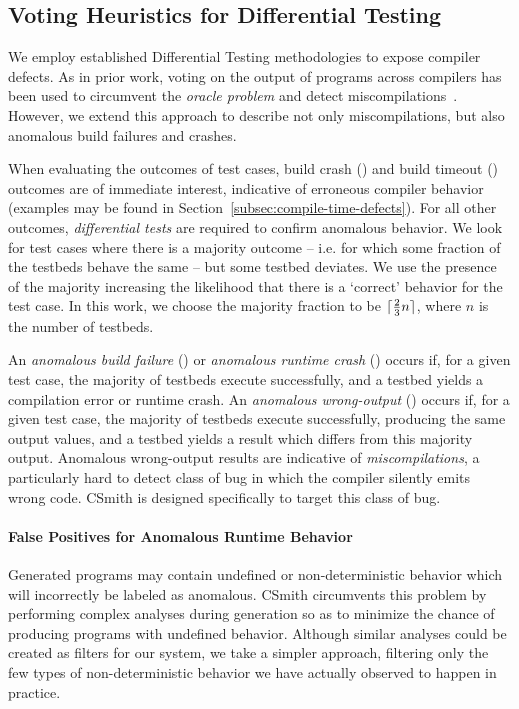 \subsection{Voting Heuristics for Differential Testing}

We employ established Differential Testing methodologies to expose compiler
defects. As in prior work, voting on the output of programs across compilers has
been used to circumvent the \emph{oracle problem} and detect
miscompilations~\cite{McKeeman1998}. However, we extend this approach to
describe not only miscompilations, but also anomalous build failures and
crashes.

When evaluating the outcomes of test cases, build crash (\bc) and build timeout
(\bto) outcomes are of immediate interest, indicative of erroneous compiler
behavior (examples may be found in Section~\ref{subsec:compile-time-defects}).
For all other outcomes, \emph{differential tests} are required to confirm
anomalous behavior. We look for test cases where there is a majority outcome --
i.e. for which some fraction of the testbeds behave the same -- but some testbed
deviates. We use the presence of the majority increasing the likelihood that
there is a `correct' behavior for the test case. In this work, we choose the
majority fraction to be $\lceil\frac{2}{3}n\rceil$, where $n$ is the number of
testbeds.

An \emph{anomalous build failure} (\abf) or \emph{anomalous runtime crash}
(\arc) occurs if, for a given test case, the majority of testbeds execute
successfully, and a testbed yields a compilation error or runtime crash. An
\emph{anomalous wrong-output} (\awo) occurs if, for a given test case, the
majority of testbeds execute successfully, producing the same output values, and
a testbed yields a result which differs from this majority output. Anomalous
wrong-output results are indicative of \emph{miscompilations}, a particularly
hard to detect class of bug in which the compiler silently emits wrong code.
CSmith is designed specifically to target this class of bug.

\paragraph{False Positives for Anomalous Runtime Behavior}%
\label{subsec:discussions}

Generated programs may contain undefined or non-deterministic behavior which
will incorrectly be labeled as anomalous. CSmith circumvents this problem by
performing  complex analyses during generation so as to minimize the chance of
producing programs with undefined behavior. Although similar analyses could be
created as filters for our system, we take a simpler approach, filtering only
the few types of non-deterministic behavior we have actually observed to happen
in practice.


